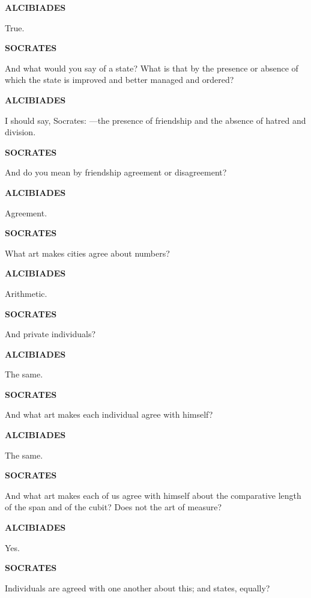\documentclass[11pt,letter]{article}
\begin{document}
\par \textbf{ALCIBIADES}
\par   True.

\par \textbf{SOCRATES}
\par   And what would you say of a state? What is that by the presence or absence of which the state is improved and better managed and ordered?

\par \textbf{ALCIBIADES}
\par   I should say, Socrates: —the presence of friendship and the absence of hatred and division.

\par \textbf{SOCRATES}
\par   And do you mean by friendship agreement or disagreement?

\par \textbf{ALCIBIADES}
\par   Agreement.

\par \textbf{SOCRATES}
\par   What art makes cities agree about numbers?

\par \textbf{ALCIBIADES}
\par   Arithmetic.

\par \textbf{SOCRATES}
\par   And private individuals?

\par \textbf{ALCIBIADES}
\par   The same.

\par \textbf{SOCRATES}
\par   And what art makes each individual agree with himself?

\par \textbf{ALCIBIADES}
\par   The same.

\par \textbf{SOCRATES}
\par   And what art makes each of us agree with himself about the comparative length of the span and of the cubit? Does not the art of measure?

\par \textbf{ALCIBIADES}
\par   Yes.

\par \textbf{SOCRATES}
\par   Individuals are agreed with one another about this; and states, equally?
\end{document}
